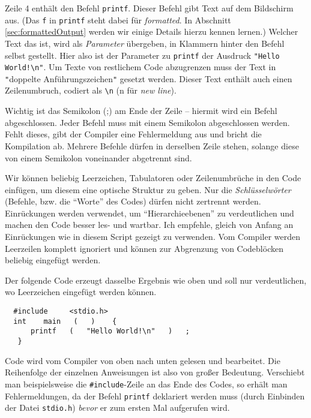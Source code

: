 Zeile 4 enthält den Befehl \texttt{printf}. Dieser Befehl gibt Text auf dem Bildschirm aus. (Das \texttt{f} in \texttt{printf} steht dabei für \emph{formatted}. In Abschnitt \ref{sec:formattedOutput} werden wir einige Details hierzu kennen lernen.) Welcher Text das ist, wird als \emph{Parameter} übergeben, \ie in Klammern hinter den Befehl selbst gestellt. Hier also ist der Parameter zu \texttt{printf} der Ausdruck \texttt{"Hello World!\textbackslash n"}. Um Texte von restlichem Code abzugrenzen muss der Text in \texttt{"}doppelte Anführungszeichen\texttt{"} gesetzt werden. Dieser Text enthält auch einen Zeilenumbruch, codiert als \texttt{\textbackslash n} (n für \emph{new line}).

Wichtig ist das Semikolon (;) am Ende der Zeile -- hiermit wird ein Befehl abgeschlossen. Jeder Befehl muss mit einem Semikolon abgeschlossen werden. Fehlt dieses, gibt der Compiler eine Fehlermeldung aus und bricht die Kompilation ab. Mehrere Befehle dürfen in derselben Zeile stehen, solange diese von einem Semikolon voneinander abgetrennt sind.

Wir können beliebig Leerzeichen, Tabulatoren oder Zeilenumbrüche in den Code einfügen, um diesem eine optische Struktur zu geben. Nur die \emph{Schlüsselwörter} (\eg Befehle, bzw. die \enquote{Worte} des Codes) dürfen nicht zertrennt werden. Einrückungen werden verwendet, um \enquote{Hierarchieebenen} zu verdeutlichen und machen den Code besser les- und wartbar. Ich empfehle, gleich von Anfang an Einrückungen wie in diesem Script gezeigt zu verwenden. Vom Compiler werden Leerzeilen komplett ignoriert und können zur Abgrenzung von Codeblöcken beliebig eingefügt werden.

Der folgende Code erzeugt dasselbe Ergebnis wie oben und soll nur verdeutlichen, wo Leerzeichen eingefügt werden können.
\begin{codebox}
\begin{verbatim}
  #include     <stdio.h>
  int    main   (   )    {
      printf   (   "Hello World!\n"   )   ;
   }
\end{verbatim}
\end{codebox}

Code wird vom Compiler von oben nach unten gelesen und bearbeitet. Die Reihenfolge der einzelnen Anweisungen ist also von großer Bedeutung. Verschiebt man beispielsweise die \texttt{#include}-Zeile an das Ende des Codes, so erhält man Fehlermeldungen, da der Befehl \texttt{printf} deklariert werden muss (durch Einbinden der Datei \texttt{stdio.h}) \emph{bevor} er zum ersten Mal aufgerufen wird.


